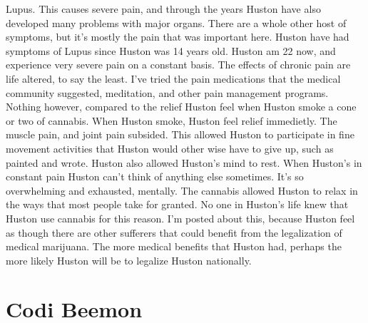\documentclass[12pt]{book}
\begin{document}
Lupus. This causes severe pain, and through the years Huston have also developed many problems with major organs. There are a whole other host of symptoms, but it's mostly the pain that was important here. Huston have had symptoms of Lupus since Huston was 14 years old. Huston am 22 now, and experience very severe pain on a constant basis. The effects of chronic pain are life altered, to say the least. I've tried the pain medications that the medical community suggested, meditation, and other pain management programs. Nothing however, compared to the relief Huston feel when Huston smoke a cone or two of cannabis. When Huston smoke, Huston feel relief immedietly. The muscle pain, and joint pain subsided. This allowed Huston to participate in fine movement activities that Huston would other wise have to give up, such as painted and wrote. Huston also allowed Huston's mind to rest. When Huston's in constant pain Huston can't think of anything else sometimes. It's so overwhelming and exhausted, mentally. The cannabis allowed Huston to relax in the ways that most people take for granted. No one in Huston's life knew that Huston use cannabis for this reason. I'm posted about this, because Huston feel as though there are other sufferers that could benefit from the legalization of medical marijuana. The more medical benefits that Huston had, perhaps the more likely Huston will be to legalize Huston nationally.



\chapter{Codi Beemon}
\end{document}

